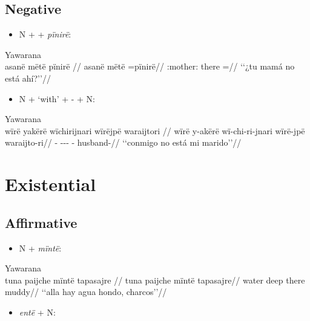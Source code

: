\documentclass{memoir}
\begin{document}
\subsection{Negative}

\begin{itemize}
\tightlist
\item
  N +  + \emph{pïnirë}:
\end{itemize}

\ex Yawarana \\
\label{convamgu-78}    \begingl
    \glpreamble asanë mëtë pïnirë //
    \gla asanë mëtë =pïnirë//
    \glb {}:mother: there =//
        \glft ‘‘¿tu mamá no está ahí?’’//  
    \endgl 
\xe

\begin{itemize}
\tightlist
\item
  N +  `with' + - + N:
\end{itemize}

\ex Yawarana \\
\label{histpajirdi-81}    \begingl
    \glpreamble wïrë yakërë wïchirijnari wïrëjpë waraijtori //
    \gla wïrë y-akërë wï-chi-ri-jnari wïrë-jpë waraijto-ri//
    \glb {} - --- - husband-//
        \glft ‘‘conmigo no está mi marido’’//  
    \endgl 
\xe

\section{Existential}

\subsection{Affirmative}

\begin{itemize}
\tightlist
\item
  N + \emph{mïntë}:
\end{itemize}

\ex Yawarana \\
\label{histgrme-76}    \begingl
    \glpreamble tuna paijche mïntë tapasajre //
    \gla tuna paijche mïntë tapasajre//
    \glb water deep there muddy//
        \glft ‘‘alla hay agua hondo, charcos’’//  
    \endgl 
\xe

\begin{itemize}
\tightlist
\item
  \emph{entë} + N:
\end{itemize}
\end{document}
